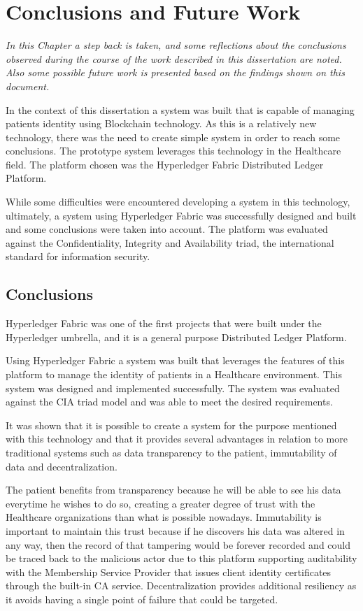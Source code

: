 \chapter{Conclusions and Future Work}
\label{Conclusion}

\emph{In this Chapter a step back is taken, and some reflections about the
conclusions observed during the course of the work described in this
dissertation are noted. Also some possible future work is presented based on
the findings shown on this document.}

In the context of this dissertation a system was built that is capable of
managing patients identity using Blockchain technology. As this is a relatively
new technology, there was the need to create simple system in order to reach
some conclusions. The prototype system leverages this technology in the
Healthcare field. The platform chosen was the Hyperledger Fabric Distributed
Ledger Platform. 

While some difficulties were encountered developing a system in this
technology, ultimately, a system using Hyperledger Fabric was successfully
designed and built and some conclusions were taken into account. The platform
was evaluated against the Confidentiality, Integrity and Availability triad,
the international standard for information security.

\section{Conclusions}

Hyperledger Fabric was one of the first projects that were built under the
Hyperledger umbrella, and it is a general purpose Distributed Ledger Platform.

Using Hyperledger Fabric a system was built that leverages the features of this
platform to manage the identity of patients in a Healthcare environment. This
system was designed and implemented successfully. The system was evaluated
against the CIA triad model and was able to meet the desired requirements.

It was shown that it is possible to create a system for the purpose mentioned
with this technology and that it provides several advantages in relation to
more traditional systems such as data transparency to the patient, immutability
of data and decentralization.

The patient benefits from transparency because he will be able to see his data
everytime he wishes to do so, creating a greater degree of trust with the
Healthcare organizations than what is possible nowadays. Immutability is
important to maintain this trust because if he discovers his data was altered
in any way, then the record of that tampering would be forever recorded and
could be traced back to the malicious actor due to this platform supporting
auditability with the Membership Service Provider that issues client identity
certificates through the built-in CA service.  Decentralization provides
additional resiliency as it avoids having a single point of failure that could
be targeted.

